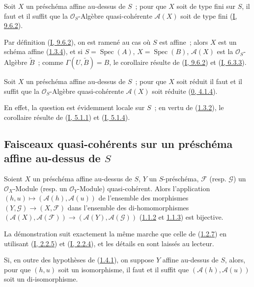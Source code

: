 \begin{corollary}[1.3.7]
\label{II.1.3.7-fr}
Soit $X$ un préschéma affine au-dessus de $S$~; pour que $X$ soit de type fini
sur $S$, il faut et il suffit que la $\mathcal{O}_S$-Algèbre quasi-cohérente
$\mathcal{A}(X)$ soit de type fini
(\hyperref[I.9.6.2-fr]{I, 9.6.2}).
\end{corollary}

Par définition (\hyperref[I.9.6.2-fr]{I, 9.6.2}), on est ramené au cas où
$S$ est affine~; alors $X$ est un schéma affine
(\hyperref[II.1.3.4-fr]{1.3.4}), et si $S=\operatorname{Spec}(A)$,
$X=\operatorname{Spec}(B)$, $\mathcal{A}(X)$ est la
$\mathcal{O}_S$-Algèbre $\widetilde{B}$~; comme
$\Gamma(U,\widetilde{B})=B$, le corollaire résulte de
(\hyperref[I.9.6.2-fr]{I, 9.6.2}) et
(\hyperref[I.6.3.3-fr]{I, 6.3.3}).

\begin{corollary}[1.3.8]
\label{II.1.3.8-fr}
Soit $X$ un préschéma affine au-dessus de $S$~; pour que $X$ soit réduit il
faut et il suffit que la $\mathcal{O}_S$-Algèbre quasi-cohérente
$\mathcal{A}(X)$ soit réduite
(\hyperref[0.4.1.4-fr]{0, 4.1.4}).
\end{corollary}

En effet, la question est évidemment locale sur $S$~; en vertu de
(\hyperref[II.1.3.2-fr]{1.3.2}), le corollaire résulte de
(\hyperref[I.5.1.1-fr]{I, 5.1.1}) et
(\hyperref[I.5.1.4-fr]{I, 5.1.4}).

\subsection{Faisceaux quasi-cohérents sur un préschéma affine au-dessus de
$S$}
\label{subsection:II.1.4-fr}

\begin{proposition}[1.4.1]
\label{II.1.4.1-fr}
Soient $X$ un préschéma affine au-dessus de $S$, $Y$ un $S$-préschéma,
$\mathcal{F}$ (resp. $\mathcal{G}$) un $\mathcal{O}_X$-Module (resp. un
$\mathcal{O}_Y$-Module) quasi-cohérent. Alors l'application
$(h,u)\mapsto(\mathcal{A}(h),\mathcal{A}(u))$ de l'ensemble des morphismes
$(Y,\mathcal{G})\to(X,\mathcal{F})$ dans l'ensemble des di-homomorphismes
$(\mathcal{A}(X),\mathcal{A}(\mathcal{F}))\to
(\mathcal{A}(Y),\mathcal{A}(\mathcal{G}))$
(\hyperref[II.1.1.2-fr]{1.1.2} et
\hyperref[II.1.1.3-fr]{1.1.3}) est bijective.
\end{proposition}

La démonstration suit exactement la même marche que celle de
(\hyperref[II.1.2.7-fr]{1.2.7}) en utilisant
(\hyperref[I.2.2.5-fr]{I, 2.2.5}) et
(\hyperref[I.2.2.4-fr]{I, 2.2.4}), et les détails en sont laissés au
lecteur.

\begin{corollary}[1.4.2]
\label{II.1.4.2-fr}
Si, en outre des hypothèses de (\hyperref[II.1.4.1-fr]{1.4.1}), on suppose
$Y$ affine au-dessus de $S$, alors, pour que $(h,u)$ soit un isomorphisme,
il faut et il suffit que $(\mathcal{A}(h),\mathcal{A}(u))$ soit un
di-isomorphisme.
\end{corollary}

